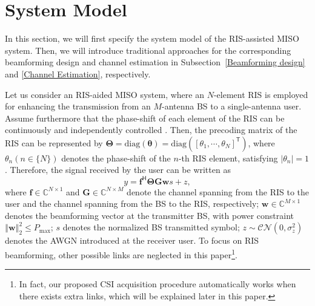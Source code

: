 \documentclass[journal,twocolumn]{IEEEtran}
\theoremstyle{nonumberplain}
\def \T {\bm \Theta}
\def \diag {\text{diag}}
\def \T {^{\mathsf{T}}}
\def \H {^{\mathsf{H}}}
\begin{document}
\section{System Model}  \label{System Model}
    In this section, we will first specify the system model of the RIS-assisted \ac{MISO} system.
    Then, we will introduce traditional approaches for the corresponding beamforming design and channel estimation in Subsection~\ref{Beamforming design} and \ref{Channel Estimation}, respectively.

    Let us consider an RIS-aided MISO system, where an $N$-element RIS is employed for enhancing the transmission from an $M$-antenna \ac{BS} to a single-antenna user. 
    Assume furthermore that the phase-shift of each element of the RIS can be continuously and independently controlled \cite{wu2019intelligent}. Then, the precoding matrix of the RIS can be represented by $\bm \Theta = \diag \left(\bm \theta\right )=\diag \left(\left[\theta_{1},\cdots ,\theta_{N}\right]\T\right)$,
    where $\theta_n (n\in \{N\})$ denotes the phase-shift of the $n$-th RIS element, satisfying $\lvert \theta_n\rvert=1$. Therefore, the signal received by the user can be written as 
        \begin{equation}
            \label{Signal model}
            y=\bm f\H \bm\Theta \bm G \bm w s+z,
        \end{equation}
        where $\bm f\in \mathbb C ^{N\times 1}$ and $\bm G \in \mathbb C^{N\times M}$ denote the channel spanning from the RIS to the user and the channel spanning from the BS to the RIS, respectively; $\bm w\in \mathbb C^{M\times 1}$ denotes the beamforming vector at the transmitter BS, with power constraint $\left\Vert \bm w\right \Vert_{2}^{2}\leq P_{\text{max}}$; $s$ denotes the normalized BS transmitted symbol; $z\sim \mathcal{CN}\left(0,\sigma_{z}^{2}\right)$ denotes the \ac{AWGN} introduced at the receiver user. To focus on RIS beamforming, other possible links are neglected in this paper\footnote{In fact, our proposed CSI acquisition procedure automatically works when there exists extra links, which will be explained later in this paper.}.
        
\end{document}
